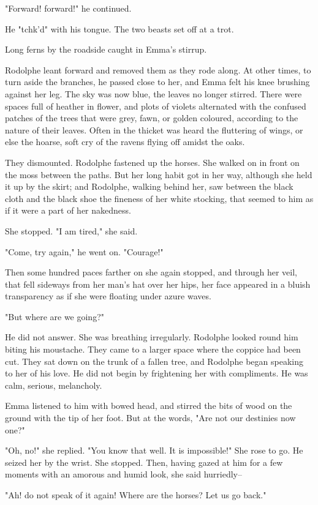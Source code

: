 \documentclass{tufte-book}
\begin{document}
"Forward! forward!" he continued.

He "tchk'd" with his tongue. The two beasts set off at a trot.

Long ferns by the roadside caught in Emma's stirrup.

Rodolphe leant forward and removed them as they rode along. At other
times, to turn aside the branches, he passed close to her, and Emma felt
his knee brushing against her leg. The sky was now blue, the leaves no
longer stirred. There were spaces full of heather in flower, and plots
of violets alternated with the confused patches of the trees that were
grey, fawn, or golden coloured, according to the nature of their leaves.
Often in the thicket was heard the fluttering of wings, or else the
hoarse, soft cry of the ravens flying off amidst the oaks.

They dismounted. Rodolphe fastened up the horses. She walked on in
front on the moss between the paths. But her long habit got in her way,
although she held it up by the skirt; and Rodolphe, walking behind her,
saw between the black cloth and the black shoe the fineness of her white
stocking, that seemed to him as if it were a part of her nakedness.

She stopped. "I am tired," she said.

"Come, try again," he went on. "Courage!"

Then some hundred paces farther on she again stopped, and through her
veil, that fell sideways from her man's hat over her hips, her face
appeared in a bluish transparency as if she were floating under azure
waves.

"But where are we going?"

He did not answer. She was breathing irregularly. Rodolphe looked round
him biting his moustache. They came to a larger space where the coppice
had been cut. They sat down on the trunk of a fallen tree, and Rodolphe
began speaking to her of his love. He did not begin by frightening her
with compliments. He was calm, serious, melancholy.

Emma listened to him with bowed head, and stirred the bits of wood on
the ground with the tip of her foot. But at the words, "Are not our
destinies now one?"

"Oh, no!" she replied. "You know that well. It is impossible!" She rose
to go. He seized her by the wrist. She stopped. Then, having gazed
at him for a few moments with an amorous and humid look, she said
hurriedly--

"Ah! do not speak of it again! Where are the horses? Let us go back."
\end{document}
